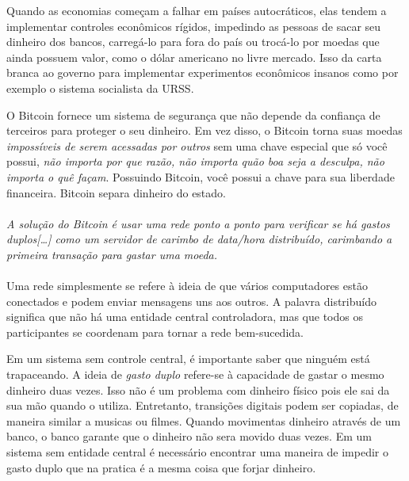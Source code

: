 Quando as economias começam a falhar em países autocráticos, elas tendem a implementar controles econômicos rígidos, impedindo as pessoas de sacar seu dinheiro dos bancos, carregá-lo para fora do país ou trocá-lo por moedas que ainda possuem valor, como o dólar americano no livre mercado.
Isso da carta branca ao governo para implementar experimentos econômicos insanos como por exemplo o sistema socialista da URSS.

O Bitcoin fornece um sistema de segurança que não depende da confiança de terceiros para proteger o seu dinheiro. Em vez disso, o Bitcoin torna suas moedas \textit{impossíveis de serem acessadas por outros} sem uma chave especial que só você possui, \textit{não importa por que razão, não importa quão boa seja a desculpa, não importa o quê façam}. Possuindo Bitcoin, você possui a chave para sua liberdade financeira. Bitcoin separa dinheiro do estado.


\paragraph{}
\textit{A solução do Bitcoin é usar uma rede ponto a ponto para verificar se há gastos duplos[\ldots] como um servidor de carimbo de data/hora distribuído, carimbando a primeira transação para gastar uma moeda.}
\paragraph{}

Uma rede simplesmente se refere à ideia de que vários computadores estão conectados e podem enviar mensagens uns aos outros. A palavra distribuído significa que não há uma entidade central controladora, mas que todos os participantes se coordenam para tornar a rede bem-sucedida.

Em um sistema sem controle central, é importante saber que ninguém está trapaceando. A ideia de \textit{gasto duplo} refere-se à capacidade de gastar o mesmo dinheiro duas vezes. Isso não é um problema com dinheiro físico pois ele sai da sua mão quando o utiliza. Entretanto, transições digitais podem ser copiadas, de maneira similar a musicas ou filmes. Quando movimentas dinheiro através de um banco, o banco garante que o dinheiro não sera movido duas vezes. Em um sistema sem entidade central é necessário encontrar uma maneira de impedir o gasto duplo que na pratica é a mesma coisa que forjar dinheiro.

